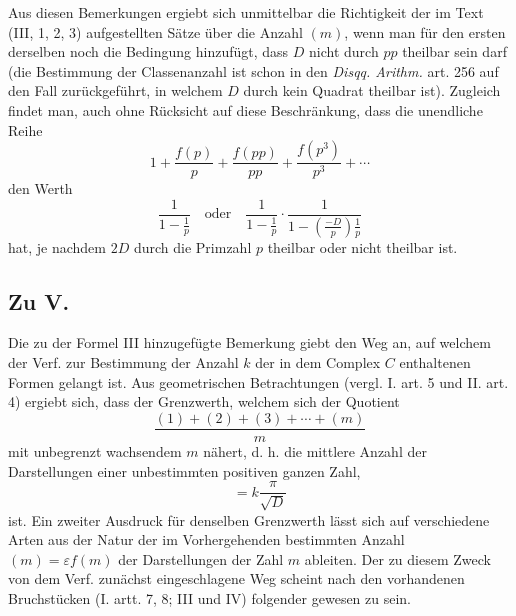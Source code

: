 \documentclass[12pt]{article}
\begin{document}
Aus diesen Bemerkungen ergiebt sich unmittelbar die Richtigkeit der im Text (III, 1, 2, 3) aufgestellten Sätze über die Anzahl \((m)\), wenn man für den ersten derselben noch die Bedingung hinzufügt, dass \(D\) nicht durch \(pp\) theilbar sein darf (die Bestimmung der Classenanzahl ist schon in den \emph{Disqq. Arithm.} art. 256 auf den Fall zurückgeführt, in welchem \(D\) durch kein Quadrat theilbar ist). Zugleich findet man, auch ohne Rücksicht auf diese Beschränkung, dass die unendliche Reihe
\[
1+\frac{f(p)}p+\frac{f(pp)}{pp}+\frac{f(p^3)}{p^3}+\cdots
\]
den Werth
\[
\frac{1}{1-\frac1p}
\quad\text{oder}\quad
\frac{1}{1-\frac1p}\cdot\frac{1}{1-\left(\frac{-D}{p}\right)\frac1p}
\]
hat, je nachdem \(2D\) durch die Primzahl \(p\) theilbar oder nicht theilbar ist.

\subsection*{Zu V.}

Die zu der Formel III hinzugefügte Bemerkung giebt den Weg an, auf welchem der Verf. zur Bestimmung der Anzahl \(k\) der in dem Complex \(C\) enthaltenen Formen gelangt ist. Aus geometrischen Betrachtungen (vergl. I. art. 5 und II. art. 4) ergiebt sich, dass der Grenzwerth, welchem sich der Quotient
\[
\frac{(1)+(2)+(3)+\cdots+(m)}{m}
\]
mit unbegrenzt wachsendem \(m\) nähert, d. h. die mittlere Anzahl der Darstellungen einer unbestimmten positiven ganzen Zahl,
\[
=k\frac{\pi}{\sqrt D}
\]
ist. Ein zweiter Ausdruck für denselben Grenzwerth lässt sich auf verschiedene Arten aus der Natur der im Vorhergehenden bestimmten Anzahl \((m)=\varepsilon f(m)\) der Darstellungen der Zahl \(m\) ableiten. Der zu diesem Zweck von dem Verf. zunächst eingeschlagene Weg scheint nach den vorhandenen Bruchstücken (I. artt. 7, 8; III und IV) folgender gewesen zu sein.
\end{document}
